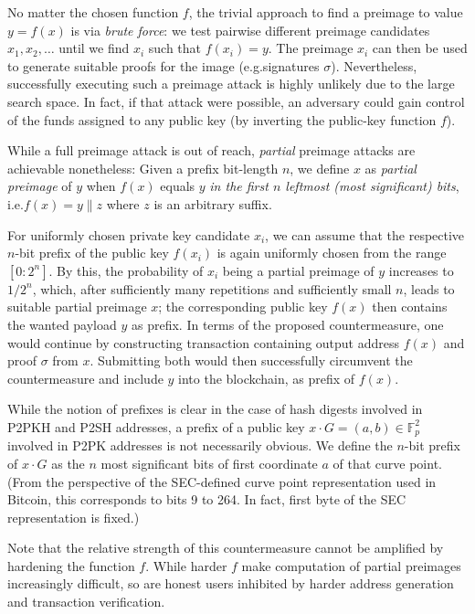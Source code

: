 \documentclass[a4paper,11pt,titlepage]{scrbook}
\begin{document}
No matter the chosen function $f$, the trivial approach to find a preimage to value $y=f(x)$ is via \emph{brute force}: we test pairwise different preimage candidates $x_1, x_2, \dots$ until we find $x_i$ such that $f(x_i)=y$.
The preimage $x_i$ can then be used to generate suitable proofs for the image (e.g.\@ signatures $\sigma$).
Nevertheless, successfully executing such a preimage attack is highly unlikely due to the large search space.
In fact, if that attack were possible, an adversary could gain control of the funds assigned to any public key (by inverting the public-key function $f$).

While a full preimage attack is out of reach, \emph{partial} preimage attacks are achievable nonetheless:
Given a prefix bit-length $n$, we define $x$ as \emph{partial preimage} of $y$ when $f(x)$ equals $y$ \emph{in the first $n$ leftmost (most significant) bits}, i.e.\@ $f(x)=y\|z$ where $z$ is an arbitrary suffix.

For uniformly chosen private key candidate $x_i$, we can assume that the respective $n$-bit prefix of the public key $f(x_i)$ is again uniformly chosen from the range $[0{:}2^n]$.
By this, the probability of $x_i$ being a partial preimage of $y$ increases to $1/2^n$, which, after sufficiently many repetitions and sufficiently small $n$, leads to suitable partial preimage $x$; the corresponding public key $f(x)$ then contains the wanted payload $y$ as prefix.
In terms of the proposed countermeasure, one would continue by constructing transaction containing output address $f(x)$ and proof $\sigma$ from $x$.
Submitting both would then successfully circumvent the countermeasure and include $y$ into the blockchain, as prefix of $f(x)$.

While the notion of prefixes is clear in the case of hash digests involved in P2PKH and P2SH addresses, a prefix of a public key $x\cdot G = (a,b) \in \mathbb{F}_p^2$ involved in P2PK addresses is not necessarily obvious.
We define the $n$-bit prefix of $x\cdot G$ as the $n$ most significant bits of first coordinate $a$ of that curve point. 
(From the perspective of the SEC-defined curve point representation used in Bitcoin, this corresponds to bits 9 to 264. In fact, first byte of the SEC representation is fixed.)

Note that the relative strength of this countermeasure cannot be amplified by hardening the function $f$.
While harder $f$ make computation of partial preimages increasingly difficult, so are honest users inhibited by harder address generation and transaction verification.
\end{document}
